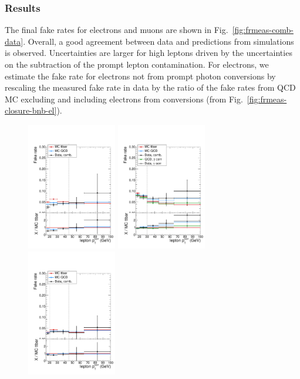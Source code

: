 \subsubsection{Results}
The final fake rates for electrons and muons are shown in Fig.~\ref{fig:frmeas-comb-data}. Overall, a good agreement between data and predictions from simulations is observed. Uncertainties are larger for high \pt leptons driven by the uncertainties on the subtraction of the prompt lepton contamination. For electrons, we estimate the fake rate for electrons not from prompt photon conversions by rescaling the measured fake rate in data by the ratio of the fake rates from QCD MC excluding and including electrons from conversions (from Fig.~\ref{fig:frmeas-closure-bnb-el}).
 \begin{figure}[htb]
          \centering
\includegraphics[width=0.35\textwidth]{plots_fakerate/measurement/fr_mu_barrel} 
\includegraphics[width=0.35\textwidth]{plots_fakerate/measurement/fr_el_barrel} \\
\includegraphics[width=0.35\textwidth]{plots_fakerate/measurement/fr_mu_endcap}

\end{figure}
